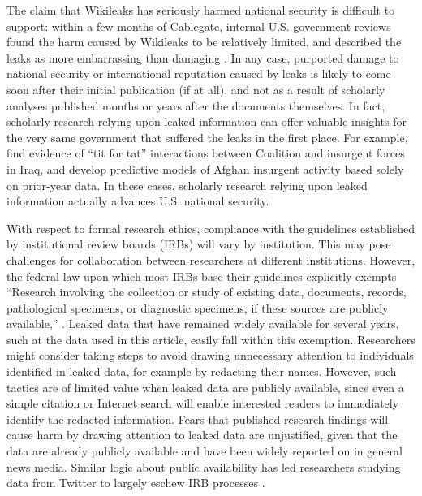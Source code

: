 \documentclass[12pt]{article}
\begin{document}
The claim that Wikileaks has seriously harmed national security 
is difficult to support: within a few months of Cablegate, internal U.S. government 
reviews found the harm caused by Wikileaks to be relatively limited, and described the leaks as more embarrassing than 
damaging \citep{hosenball2011u.s.}. In any case, purported damage to national security or international reputation caused by leaks is likely to come soon after their initial publication (if at all), 
and not as a result of scholarly analyses published months or years after the documents themselves. 
In fact, scholarly research relying upon leaked information can offer valuable insights for the very same 
government that suffered the leaks in the first place. For example, \citet{linke2012space-time} find evidence of 
``tit for tat'' interactions between Coalition and insurgent forces in Iraq, and \citet{zammit-mangion2012point} 
develop predictive models of Afghan insurgent activity based solely on prior-year data. In these cases, 
scholarly research relying upon leaked information actually advances U.S. national security.

With respect to formal research ethics, compliance with the guidelines established by institutional review boards (IRBs) will vary by institution. This may pose challenges for collaboration between researchers at different institutions.
However, the federal law upon which most IRBs base their guidelines explicitly exempts 
``Research involving the collection or study of existing data, documents, records, pathological specimens, or diagnostic
specimens, if these sources are publicly available,'' \citep[45 CFR 46.101 (b)(4)]{u.s._government2009code}.
Leaked data that have remained widely available for several years, such at the data used in this article, 
easily fall within this exemption.
Researchers might consider taking steps to avoid drawing unnecessary attention 
to individuals identified in leaked data, for example by redacting their names. However, such tactics 
are of limited value when leaked data are publicly available, since even a simple citation or Internet search will enable 
interested readers to immediately identify the redacted information.
Fears that published research findings will cause harm by drawing attention to leaked data are unjustified, 
given that the data are already publicly available and have been widely reported on in general news media. 
Similar logic about public availability has led researchers studying data from Twitter to largely eschew 
IRB processes \citep{zimmer2014topology}.
\end{document}
